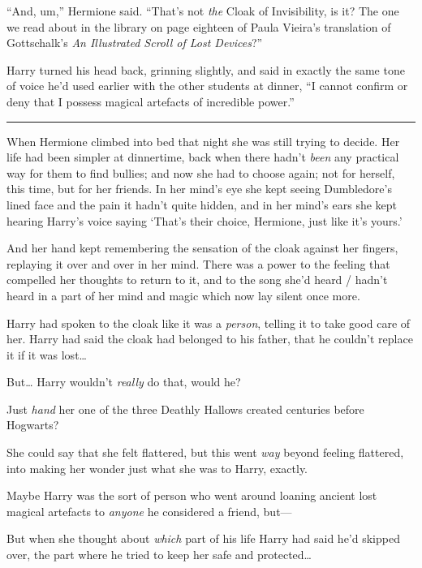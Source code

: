 ``And, um,'' Hermione said. ``That's not \emph{the} Cloak of
Invisibility, is it? The one we read about in the library on page
eighteen of Paula Vieira's translation of Gottschalk's \emph{An
Illustrated Scroll of Lost Devices}?''

Harry turned his head back, grinning slightly, and said in exactly the
same tone of voice he'd used earlier with the other students at dinner,
``I cannot confirm or deny that I possess magical artefacts of
incredible power.''

\begin{center}\rule{3in}{0.4pt}\end{center}

When Hermione climbed into bed that night she was still trying to
decide. Her life had been simpler at dinnertime, back when there hadn't
\emph{been} any practical way for them to find bullies; and now she had
to choose again; not for herself, this time, but for her friends. In her
mind's eye she kept seeing Dumbledore's lined face and the pain it
hadn't quite hidden, and in her mind's ears she kept hearing Harry's
voice saying `That's their choice, Hermione, just like it's yours.'

And her hand kept remembering the sensation of the cloak against her
fingers, replaying it over and over in her mind. There was a power to
the feeling that compelled her thoughts to return to it, and to the song
she'd heard / hadn't heard in a part of her mind and magic which now lay
silent once more.

Harry had spoken to the cloak like it was a \emph{person}, telling it to
take good care of her. Harry had said the cloak had belonged to his
father, that he couldn't replace it if it was lost\ldots{}

But\ldots{} Harry wouldn't \emph{really} do that, would he?

Just \emph{hand} her one of the three Deathly Hallows created centuries
before Hogwarts?

She could say that she felt flattered, but this went \emph{way} beyond
feeling flattered, into making her wonder just what she was to Harry,
exactly.

Maybe Harry was the sort of person who went around loaning ancient lost
magical artefacts to \emph{anyone} he considered a friend, but---

But when she thought about \emph{which} part of his life Harry had said
he'd skipped over, the part where he tried to keep her safe and
protected\ldots{}

